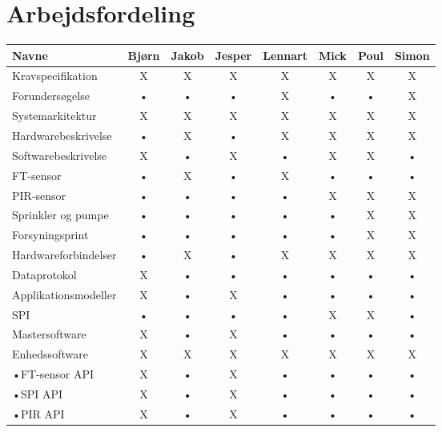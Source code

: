\chapter*{Arbejdsfordeling}

\begin{tabular}{|l|c|c|c|c|c|c|c|}
\hline 
\textbf{Navne} 		& Bjørn 	& Jakob 	& Jesper 	& Lennart 	& Mick 	& Poul 	& Simon \\ 
\hline 
Kravspecifikation 	& X 		& X 		& X 			& X 			& X 		& X 		& X \\ 
\hline 
Forundersøgelse 		& • 		& • 		& • 			& X 			& • 		& • 		& X \\ 
\hline 
Systemarkitektur 	& X 		& X 		& X 			& X 			& X 		& X 		& X \\ 
\hline 
Hardwarebeskrivelse	& • 		& X 		& • 			& X 			& X 		& X 		& X \\ 
\hline 
Softwarebeskrivelse	& X 		& • 		& X 			& • 			& X 		& X 		& • \\ 
\hline 
FT-sensor			& • 		& X 		& • 			& X 			& • 		& • 		& • \\ 
\hline 
PIR-sensor			& • 		& • 		& • 			& • 			& X 		& X 		& X \\ 
\hline 
Sprinkler og pumpe	& • 		& • 		& • 			& • 			& • 		& X 		& X \\ 
\hline 
Forsyningsprint		& • 		& • 		& • 			& • 			& • 		& X		& X \\ 
\hline 
Hardwareforbindelser	& • 		& X 		& • 			& X 			& X 		& X 		& X \\ 
\hline 
Dataprotokol			& X 		& • 		& • 			& • 			& • 		& • 		& • \\  
\hline 
Applikationsmodeller	& X 		& • 		& X 			& • 			& • 		& • 		& • \\ 
\hline 
SPI				& • 		& • 		& • 			& • 			& X 		& X 		& • \\  
\hline 
Mastersoftware			& X 		& • 		& X 			& • 			& • 		& • 		& • \\  
\hline 
Enhedssoftware			& X 		& X 		& X 			& X 			& X 		& X 		& X \\
\hline 
•FT-sensor API			& X 		& • 		& X 			& • 			& • 		& • 		& • \\  
\hline 
•SPI API			& X 		& • 		& X 			& • 			& • 		& • 		& • \\  
\hline
•PIR API			& X 		& • 		& X 			& • 			& • 		& • 		& • \\  
\hline 
\end{tabular} 